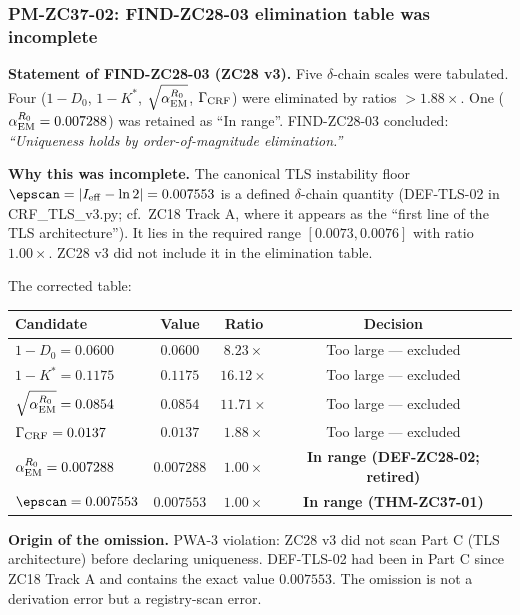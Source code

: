 \documentclass[12pt, a4paper]{article}
\begin{document}
\subsubsection{PM-ZC37-02: FIND-ZC28-03 elimination table was incomplete}
\label{sec:pm37-02}

\begin{openqbox}[title={PM-ZC37-02: FIND-ZC28-03 elimination omitted
  $\epscan$}]
\label{pm:zc37-02}
\textbf{Statement of FIND-ZC28-03 (ZC28 v3).}
Five $\delta$-chain scales were tabulated. Four
($1 - D_0$, $1 - K^*$, $\sqrt{\alpha_{\rm EM}^{R_0}}$,
$\Gamma_{\rm CRF}$) were eliminated by ratios $> 1.88\times$.
One ($\alpha_{\rm EM}^{R_0} = 0.007288$) was retained as
``In range''. FIND-ZC28-03 concluded:
\emph{``Uniqueness holds by order-of-magnitude elimination.''}

\medskip
\textbf{Why this was incomplete.}
The canonical TLS instability floor
$\epscan = |I_{\rm eff} - \ln 2| = 0.007553$ is a defined
$\delta$-chain quantity (DEF-TLS-02 in CRF\_TLS\_v3.py;
cf.\ ZC18 Track A, where it appears as the ``first line of
the TLS architecture''). It lies in the required range
$[0.0073, 0.0076]$ with ratio $1.00\times$. ZC28 v3 did
not include it in the elimination table.

The corrected table:
\begin{center}
{\small
\renewcommand{\arraystretch}{1.30}
\begin{tabular}{lccc}
\toprule
\textbf{Candidate} & \textbf{Value} &
  \textbf{Ratio} & \textbf{Decision} \\
\midrule
$1 - D_0 = 0.0600$ & $0.0600$ & $8.23\times$ &
  Too large --- excluded \\
$1 - K^* = 0.1175$ & $0.1175$ & $16.12\times$ &
  Too large --- excluded \\
$\sqrt{\alpha_{\rm EM}^{R_0}} = 0.0854$ & $0.0854$ & $11.71\times$ &
  Too large --- excluded \\
$\Gamma_{\rm CRF} = 0.0137$ & $0.0137$ & $1.88\times$ &
  Too large --- excluded \\
$\alpha_{\rm EM}^{R_0} = 0.007288$ & $0.007288$ & $1.00\times$ &
  \textbf{In range (DEF-ZC28-02; retired)} \\
$\epscan = 0.007553$ & $0.007553$ & $1.00\times$ &
  \textbf{In range (THM-ZC37-01)} \\
\bottomrule
\end{tabular}
}
\end{center}

\medskip
\textbf{Origin of the omission.}
PWA-3 violation: ZC28 v3 did not scan Part C (TLS architecture)
before declaring uniqueness. DEF-TLS-02 had been in Part C since
ZC18 Track A and contains the exact value $0.007553$. The
omission is not a derivation error but a registry-scan error.


\end{openqbox}
\end{document}
